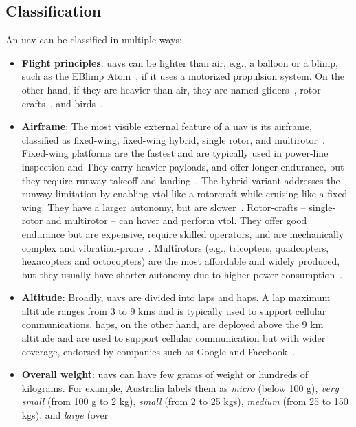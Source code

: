 \subsection{Classification}%
\label{sec:classification}
An \gls{uav} can be classified in multiple ways:
\begin{itemize}
\item \textbf{Flight principles}: \glspl{uav} can be lighter
  than air, e.g., a balloon or a blimp, such as the EBlimp Atom~\cite{eblimp-atom}, if it uses a motorized propulsion
  system. On the other hand, if they are heavier than air, they are named
  gliders~\cite{px4-glider}, rotor-crafts~\cite{energyorDrone}, and birds~\cite{drone-bird}.
\item \textbf{Airframe}: The most visible external feature of a \gls{uav} is its
  airframe, classified as fixed-wing, fixed-wing hybrid, single rotor, and
  multirotor~\cite{mohsan2022towards}.
  Fixed-wing
  platforms are the fastest and are typically used in power-line inspection and
  They carry heavier payloads, and offer longer endurance, but they require
  runway takeoff and landing~\cite{mohsan2022towards}.
The hybrid variant addresses the runway limitation by enabling \gls{vtol} like a
rotorcraft while cruising like a fixed-wing.
  They have a larger autonomy, but are slower~\cite{mohsan2022towards}.
  Rotor-crafts -- single-rotor and multirotor -- can hover and perform
  \gls{vtol}. They offer good endurance but are expensive,
  require skilled operators, and are mechanically complex and
  vibration-prone~\cite{mohsan2022towards}. Multirotors (e.g., tricopters,
  quadcopters, hexacopters and octocopters)
  are the most affordable and widely
  produced, but they usually have shorter autonomy due to higher power
  consumption~\cite{mohsan2022towards}.
\item \textbf{Altitude}: Broadly, \glspl{uav} are divided into \glspl{lap} and
  \glspl{hap}. A \gls{lap} maximum altitude ranges from 3 to 9 kms and is
  typically used to support cellular communications. \glspl{hap}, on the other
  hand, are deployed above the 9 km altitude and are used to support cellular
  communication but with wider coverage, endorsed by companies such as Google
  and Facebook~\cite{mohsan2022towards}.
%  
\item \textbf{Overall weight}: \glspl{uav} can have few grams of weight or
  hundreds of kilograms. For example, Australia labels them as \emph{micro}
  (below 100 g),
  \emph{very small} (from 100 g to 2 kg), \emph{small} (from 2 to 25 kgs),
  \emph{medium} (from 25 to 150 kgs), and \emph{large} (over

\end{itemize}
